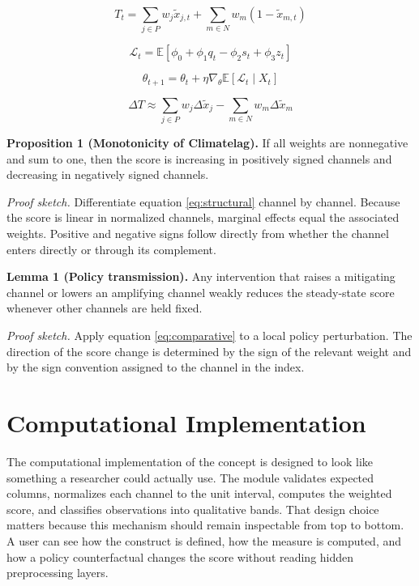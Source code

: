 \documentclass[12pt]{article}
\begin{document}
\begin{equation}
T_t = \sum_{j \in P} w_j \tilde{x}_{j,t} + \sum_{m \in N} w_m (1 - \tilde{x}_{m,t})
\label{eq:structural}
\end{equation}

\begin{equation}
\mathcal{L}_t = \mathbb{E}\left[\phi_0 + \phi_1 q_t - \phi_2 s_t + \phi_3 z_t\right]
\label{eq:loss}
\end{equation}

\begin{equation}
\theta_{t+1} = \theta_t + \eta \nabla_\theta \mathbb{E}[\mathcal{L}_t \mid X_t]
\label{eq:update}
\end{equation}

\begin{equation}
\Delta T \approx \sum_{j \in P} w_j \Delta \tilde{x}_j - \sum_{m \in N} w_m \Delta \tilde{x}_m
\label{eq:comparative}
\end{equation}

\textbf{Proposition 1 (Monotonicity of Climatelag).} If all weights are nonnegative and sum to one, then the score is increasing in positively signed channels and decreasing in negatively signed channels.

\textit{Proof sketch.} Differentiate equation \eqref{eq:structural} channel by channel. Because the score is linear in normalized channels, marginal effects equal the associated weights. Positive and negative signs follow directly from whether the channel enters directly or through its complement.

\textbf{Lemma 1 (Policy transmission).} Any intervention that raises a mitigating channel or lowers an amplifying channel weakly reduces the steady-state score whenever other channels are held fixed.

\textit{Proof sketch.} Apply equation \eqref{eq:comparative} to a local policy perturbation. The direction of the score change is determined by the sign of the relevant weight and by the sign convention assigned to the channel in the index.

\section{Computational Implementation}
The computational implementation of the concept is designed to look like something a researcher could actually use. The module validates expected columns, normalizes each channel to the unit interval, computes the weighted score, and classifies observations into qualitative bands. That design choice matters because this mechanism should remain inspectable from top to bottom. A user can see how the construct is defined, how the measure is computed, and how a policy counterfactual changes the score without reading hidden preprocessing layers.
\end{document}
